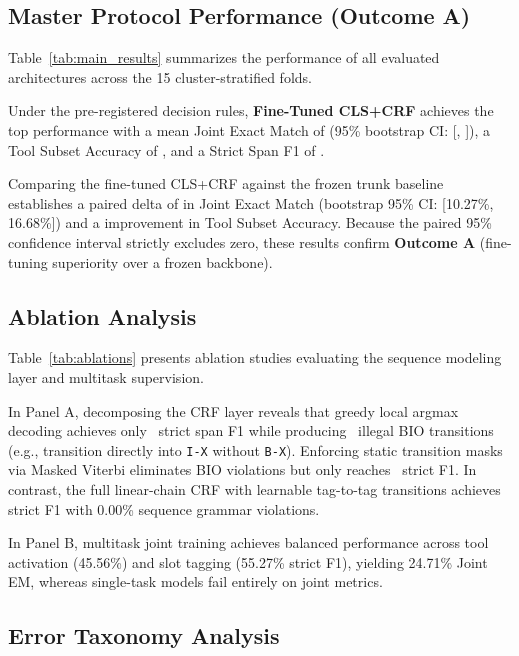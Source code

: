 \documentclass[letterpaper]{article}
\begin{document}
\subsection{Master Protocol Performance (Outcome A)}

Table~\ref{tab:main_results} summarizes the performance of all evaluated architectures across the 15 cluster-stratified folds.

Under the pre-registered decision rules, \textbf{Fine-Tuned CLS+CRF} achieves the top performance with a mean Joint Exact Match of \textbf{\PrimaryJointEM} (95\% bootstrap CI: [\PrimaryJointEMCILow, \PrimaryJointEMCIHigh]), a Tool Subset Accuracy of \textbf{\PrimaryToolAcc}, and a Strict Span F1 of \textbf{\PrimaryStrictFOne}.

Comparing the fine-tuned CLS+CRF against the frozen trunk baseline establishes a paired delta of \textbf{\FineTuningJointEMDelta} in Joint Exact Match (bootstrap 95\% CI: [10.27\%, 16.68\%]) and a \textbf{\FineTuningToolAccDelta} improvement in Tool Subset Accuracy. Because the paired 95\% confidence interval strictly excludes zero, these results confirm \textbf{Outcome A} (fine-tuning superiority over a frozen backbone).

\subsection{Ablation Analysis}



Table~\ref{tab:ablations} presents ablation studies evaluating the sequence modeling layer and multitask supervision.

In Panel A, decomposing the CRF layer reveals that greedy local argmax decoding achieves only \CRFGreedyStrictFOne\ strict span F1 while producing \CRFGreedyBIOViolations\ illegal BIO transitions (e.g., transition directly into \texttt{I-X} without \texttt{B-X}). Enforcing static transition masks via Masked Viterbi eliminates BIO violations but only reaches \CRFMaskedViterbiStrictFOne\ strict F1. In contrast, the full linear-chain CRF with learnable tag-to-tag transitions achieves \textbf{\CRFFullStrictFOne} strict F1 with 0.00\% sequence grammar violations.

In Panel B, multitask joint training achieves balanced performance across tool activation (45.56\%) and slot tagging (55.27\% strict F1), yielding 24.71\% Joint EM, whereas single-task models fail entirely on joint metrics.

\subsection{Error Taxonomy Analysis}
\end{document}
